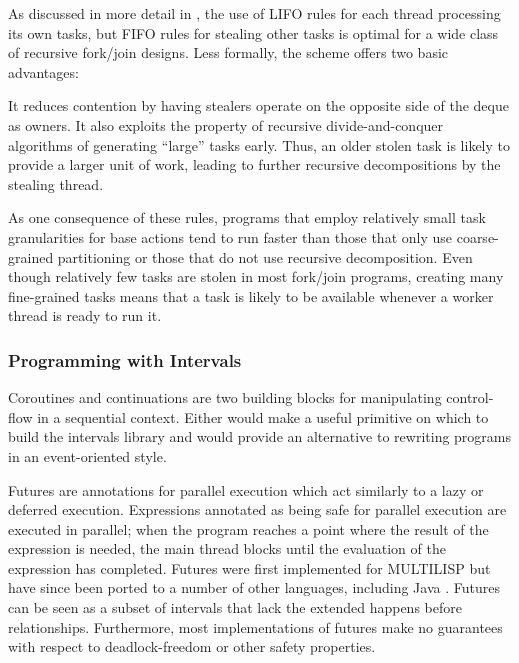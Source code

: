 
As discussed in more detail in \cite{Frigo1998}, the use of LIFO rules
for each thread processing its own tasks, but FIFO rules for stealing
other tasks is optimal for a wide class of recursive fork/join
designs. Less formally, the scheme offers two basic advantages:

It reduces contention by having stealers operate on the opposite
side of the deque as owners. It also exploits the property of
recursive divide-and-conquer algorithms of generating ``large''
tasks early. Thus, an older stolen task is likely to provide a
larger unit of work, leading to further recursive decompositions
by the stealing thread.

As one consequence of these rules, programs that employ
relatively small task granularities for base actions tend to run
faster than those that only use coarse-grained partitioning or
those that do not use recursive decomposition. Even though
relatively few tasks are stolen in most fork/join programs,
creating many fine-grained tasks means that a task is likely to
be available whenever a worker thread is ready to run it.

\subsubsection{Programming with Intervals \cite{Matsakis2009b}}

Coroutines \cite{Conway1963} and continuations \cite{Reynolds1993} are
two building blocks for manipulating control-flow in a sequential
context. Either would make a useful primitive on which to build the
intervals library and would provide an alternative to rewriting
programs in an event-oriented style.

Futures are annotations for parallel execution which act similarly to
a lazy or deferred execution. Expressions annotated as being safe for
parallel execution are executed in parallel; when the program reaches
a point where the result of the expression is needed, the main thread
blocks until the evaluation of the expression has completed. Futures
were first implemented for MULTILISP \cite{Halstead1985} but have
since been ported to a number of other languages, including Java
\cite{Navabi2008}.  Futures can be seen as a subset of intervals that
lack the extended happens before relationships. Furthermore, most
implementations of futures make no guarantees with respect to
deadlock-freedom or other safety properties.


